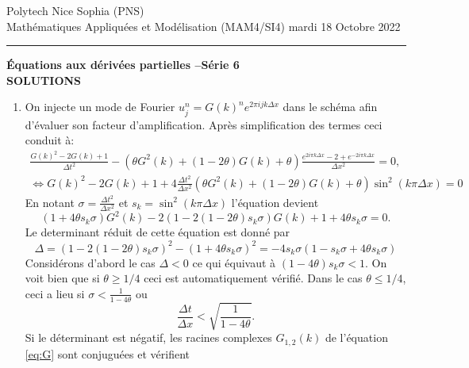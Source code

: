 \documentclass[12pt,a4paper]{article}
\begin{document}
 \hfill Polytech Nice Sophia (PNS)\\
\noindent Math\'ematiques Appliqu\'ees et Mod\'elisation (MAM4/SI4) \hfill mardi 18 Octobre 2022 \\

\hrule

\bigskip
\bigskip

\begin{center}{\bf \'Equations aux d\'eriv\'ees partielles --S\'erie 6 \\
SOLUTIONS}\end{center}

\bigskip

\begin{enumerate}
\item On injecte un mode de Fourier $u_j^n= G(k)^n e^{2\pi ijk\Delta
    x}$ dans le sch\'ema afin d'\'evaluer son facteur
  d'amplification. Apr\`es simplification des termes ceci conduit \`a:
\begin{equation}
\begin{array}{l}
\displaystyle\frac{G(k)^2-2G(k)+1}{\Delta t ^2}-(\theta
G^2(k)+(1-2\theta)G(k)+\theta)\frac{e^{2i\pi k\Delta x} -2 + e^{-2i\pi
    k\Delta x}}{\Delta x^2}=0,\\
\displaystyle\Leftrightarrow G(k)^2-2G(k)+1 + 4\frac{\Delta t^2}{\Delta x^2} (\theta
G^2(k)+(1-2\theta)G(k)+\theta) \sin^2(k\pi \Delta x)=0
\end{array}
\end{equation}
En notant $\sigma=\frac{\Delta t^2}{\Delta x^2}$ et $s_k = \sin^2(k\pi
\Delta x)$ l'\'equation devient
\begin{equation}\label{eq:G}
(1+4\theta s_k \sigma)G^2(k)-2(1- 2(1-2\theta) s_k\sigma)G(k)+1+4\theta s_k\sigma=0.
\end{equation}
Le determinant r\'eduit de cette \'equation est donn\'e par
$$
\Delta =(1- 2(1-2\theta) s_k\sigma)^2-(1+4\theta s_k
\sigma)^2=-4s_k\sigma (1-s_k\sigma +4\theta s_k\sigma)
$$
Consid\'erons d'abord le cas $\Delta < 0$ ce qui \'equivaut \`a $(1-4\theta) s_k\sigma <
1$. On voit bien que si $\theta \ge 1/4$ ceci est automatiquement
v\'erifi\'e. Dans le cas $\theta \le 1/4$, ceci a lieu si $\sigma <
\frac{1}{1-4\theta}$ ou
\begin{equation}\label{eq:cond}
\frac{\Delta t}{\Delta x}< \sqrt{\frac{1}{1-4\theta}}.
\end{equation}
Si le d\'eterminant est n\'egatif, les racines complexes $G_{1,2}(k)$ de
l'\'equation \eqref{eq:G} sont conjugu\'ees et v\'erifient

\end{enumerate}
\end{document}
